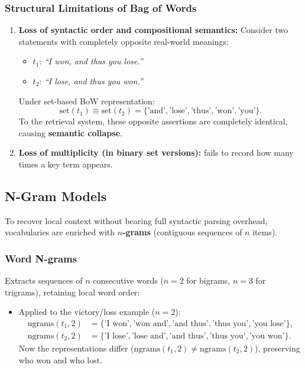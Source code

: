\subsubsection{Structural Limitations of Bag of Words}
\begin{enumerate}
    \item \textbf{Loss of syntactic order and compositional semantics:}
    Consider two statements with completely opposite real-world meanings:
    \begin{itemize}
        \item $t_1$: \textit{``I won, and thus you lose.''}
        \item $t_2$: \textit{``I lose, and thus you won.''}
    \end{itemize}
    Under set-based BoW representation:
    \begin{equation}
    \text{set}(t_1) \equiv \text{set}(t_2) = \{\text{'and'}, \text{'lose'}, \text{'thus'}, \text{'won'}, \text{'you'}\}.
    \end{equation}
    To the retrieval system, these opposite assertions are completely identical, causing \textbf{semantic collapse}.
    \item \textbf{Loss of multiplicity (in binary set versions):} fails to record how many times a key term appears.
\end{enumerate}

\subsection{N-Gram Models}
To recover local context without bearing full syntactic parsing overhead, vocabularies are enriched with \textbf{$n$-grams} (contiguous sequences of $n$ items).

\subsubsection{Word N-grams}
Extracts sequences of $n$ consecutive words ($n=2$ for bigrams, $n=3$ for trigrams), retaining local word order:
\begin{itemize}
    \item Applied to the victory/loss example ($n=2$):
    \begin{align}
    \text{ngrams}(t_1, 2) &= \{\text{'I won'}, \text{'won and'}, \text{'and thus'}, \text{'thus you'}, \text{'you lose'}\}, \\
    \text{ngrams}(t_2, 2) &= \{\text{'I lose'}, \text{'lose and'}, \text{'and thus'}, \text{'thus you'}, \text{'you won'}\}.
    \end{align}
    Now the representations differ ($\text{ngrams}(t_1, 2) \ne \text{ngrams}(t_2, 2)$), preserving who won and who lost.
\end{itemize}

